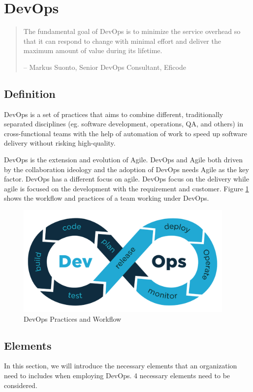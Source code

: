 \section{DevOps}
\begin{quotation}
    The fundamental goal of DevOps is to minimize the service overhead so that it can respond to change with minimal effort and deliver the maximum amount of value during its lifetime.
    \begin{flushright}
        -- Markus Suonto, Senior DevOps Consultant, Eficode
    \end{flushright}
\end{quotation}
\subsection{Definition}
DevOps is a set of practices that aims to combine different, traditionally separated disciplines (eg. software development, operations, QA, and others) in cross-functional teams with the help of automation of work to speed up software delivery without risking high-quality.\cite{bass2015devops}
\par
DevOps is the extension and evolution\cite{lwakatare2016relationship}\cite{leite2019survey} of Agile. DevOps and Agile both driven by the collaboration ideology and the adoption of DevOps needs Agile as the key factor.\cite{lwakatare2016relationship} DevOps has a different focus on agile. DevOps focus on the delivery while agile is focused on the development with the requirement and customer. Figure \ref{fig:DevOps}\cite{DevOpsin72:online} shows the workflow and practices of a team working under DevOps.
\begin{figure}[h]
    \centering
    \includegraphics[width=0.95\textwidth]{pics/DevOps.png}
    \caption{DevOps Practices and Workflow}
    \label{fig:DevOps}
\end{figure}
\subsection{Elements}
In this section, we will introduce the necessary elements that an organization need to includes when employing DevOps. 4 necessary elements need to be considered.
